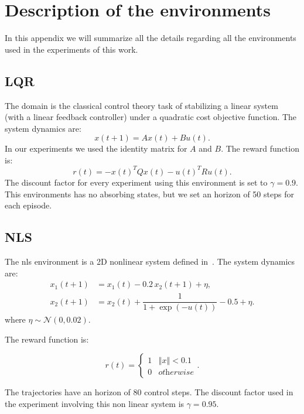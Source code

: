 \chapter{Description of the environments}
\label{a:description}

In this appendix we will summarize all the details regarding all the environments used in the experiments of this work.


\section{LQR}
\label{a:lqr_description}
The  domain is the classical control theory task of stabilizing a linear system (with a linear feedback controller) under a quadratic cost objective function. The system dynamics are:
\begin{equation*}
x(t+1) = Ax(t) + Bu(t).
\end{equation*}
In our experiments we used the identity matrix for $A$ and $B$.
The reward function is:
\begin{equation*}
r(t) = -x(t)^TQx(t) - u(t)^TRu(t).
\end{equation*}
The discount factor for every experiment using this environment is set to $\gamma=0.9$.
This environments has no absorbing states, but we set an horizon of 50 steps for each episode.

\section{NLS}
\label{a:nls_description}
The \gls{nls} environment is a 2D nonlinear system defined in~\cite{vlassis2009learning}.
The system dynamics are:
\begin{align*}
x_1(t+1)&=x_1(t)-0.2\,x_2(t+1)+\eta, \\
x_2(t+1)&=x_2(t)+\dfrac{1}{1+\exp(-u(t))}-0.5+\eta.
\end{align*}
where $\eta\sim\mathcal{N}(0,0.02)$.

The reward function is:

\begin{equation*}
r(t)=\begin{cases}
1 & \left\Vert x\right\Vert <0.1\\
0 & \textit{otherwise}
\end{cases}.
\end{equation*}

The trajectories have an horizon of 80 control steps. The discount factor used in the experiment involving this non linear system is $\gamma=0.95$.


